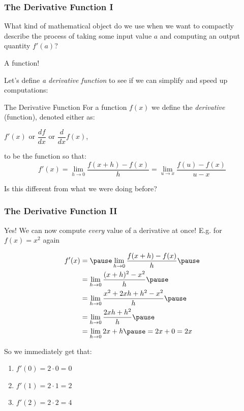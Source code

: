 \documentclass{ltx-talk}
\begin{document}
\begin{frame}
  \frametitle{The Derivative Function I}
  What kind of mathematical object do we use
  when we want to compactly describe
  the process of taking some input value $a$ \pause
  and computing an output quantity $f'(a)$? \pause

  A function! \pause

  Let's define \textit{a derivative function} to see if we can simplify and speed up computations: \pause
  \begin{block}{The Derivative Function}
    For a function $f(x)$ \pause 
    we define the \textit{derivative} (function), denoted either as: \pause
    \begin{center}
      $f'(x)$ or \pause $\dfrac{df}{dx}$ or \pause $\dfrac{d}{dx}f(x)$,
    \end{center}\pause
    to be the function so that: \pause
    \begin{equation}
      f'(x) = \lim_{h \rightarrow 0} \dfrac{f(x + h) - f(x)}{h} = \lim_{u \rightarrow x} \dfrac{f(u) - f(x)}{u - x}
    \end{equation} \pause
  \end{block}

  Is this different from what we were doing before? 
\end{frame}

\begin{frame}
  \frametitle{The Derivative Function II}
  Yes! We can now compute \textit{every} value of a derivative at once! \pause E.g. for $f(x) = x^2$ again

  \begin{align}
    f'(x) &= \pause \lim\limits_{h \rightarrow 0} \dfrac{f(x + h) - f(x)}{h} \pause \\
          &= \lim\limits_{h \rightarrow 0} \dfrac{(x+h)^2 - x^2}{h} \pause \\
          &= \lim\limits_{h \rightarrow 0} \dfrac{x^2 + 2xh + h^2 - x^2}{h} \pause \\
          &= \lim\limits_{h \rightarrow 0} \dfrac{2xh  + h^2}{h} \pause \\
          &= \lim\limits_{h \rightarrow 0} 2x + h \pause = 2x + 0 = 2x
  \end{align} \pause

  So we immediately get that: \pause
  \begin{enumerate}
    \item $f'(0) = 2 \cdot 0 = 0$ \pause
    \item $f'(1) = 2 \cdot 1 = 2$ \pause
    \item $f'(2) = 2 \cdot 2 = 4$
  \end{enumerate}
\end{frame}
\end{document}
